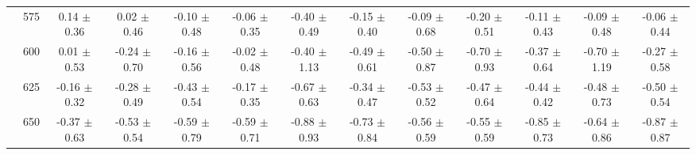 \begin{table}[h]
{\begin{tabular}{
        ccccccccccccc}
 & 575& 0.14 $\pm$ 0.36& 0.02 $\pm$ 0.46& -0.10 $\pm$ 0.48& -0.06 $\pm$ 0.35& -0.40 $\pm$ 0.49& -0.15 $\pm$ 0.40& -0.09 $\pm$ 0.68& -0.20 $\pm$ 0.51& -0.11 $\pm$ 0.43& -0.09 $\pm$ 0.48& -0.06 $\pm$ 0.44 \\ 
 & 600& 0.01 $\pm$ 0.53& -0.24 $\pm$ 0.70& -0.16 $\pm$ 0.56& -0.02 $\pm$ 0.48& -0.40 $\pm$ 1.13& -0.49 $\pm$ 0.61& -0.50 $\pm$ 0.87& -0.70 $\pm$ 0.93& -0.37 $\pm$ 0.64& -0.70 $\pm$ 1.19& -0.27 $\pm$ 0.58 \\ 
 & 625& -0.16 $\pm$ 0.32& -0.28 $\pm$ 0.49& -0.43 $\pm$ 0.54& -0.17 $\pm$ 0.35& -0.67 $\pm$ 0.63& -0.34 $\pm$ 0.47& -0.53 $\pm$ 0.52& -0.47 $\pm$ 0.64& -0.44 $\pm$ 0.42& -0.48 $\pm$ 0.73& -0.50 $\pm$ 0.54 \\ 
 & 650& -0.37 $\pm$ 0.63& -0.53 $\pm$ 0.54& -0.59 $\pm$ 0.79& -0.59 $\pm$ 0.71& -0.88 $\pm$ 0.93& -0.73 $\pm$ 0.84& -0.56 $\pm$ 0.59& -0.55 $\pm$ 0.59& -0.85 $\pm$ 0.73& -0.64 $\pm$ 0.86& -0.87 $\pm$ 0.87 \\ \hline 

        \end{tabular}%
        }

        \end{table}
        
